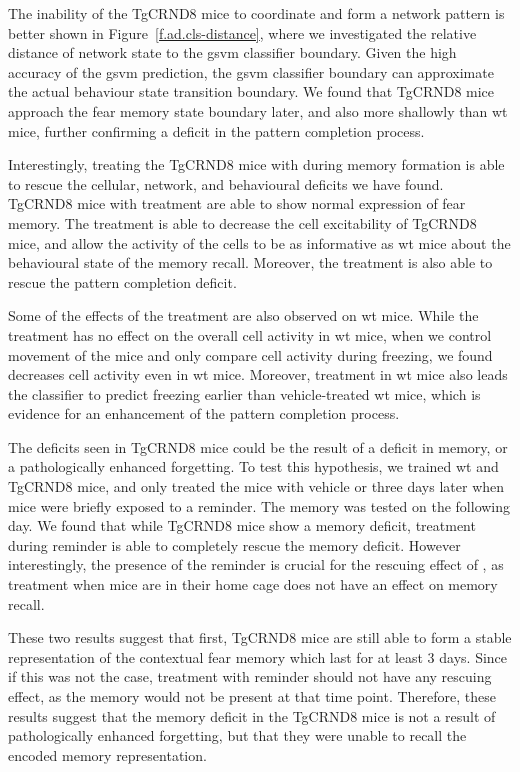 The inability of the TgCRND8 mice to coordinate and form a network pattern is better shown in Figure~\ref{f.ad.cls-distance}, where we investigated the relative distance of network state to the \gls{gsvm} classifier boundary. Given the high accuracy of the \gls{gsvm} prediction, the \gls{gsvm} classifier boundary can approximate the actual behaviour state transition boundary. We found that TgCRND8 mice approach the fear memory state boundary later, and also more shallowly than \gls{wt} mice, further confirming a deficit in the pattern completion process. 

Interestingly, treating the TgCRND8 mice with \tglu{} during memory formation is able to rescue the cellular, network, and behavioural deficits we have found. TgCRND8 mice with \tglu{} treatment are able to show normal expression of fear memory. The \tglu{} treatment is able to decrease the cell excitability of TgCRND8 mice, and allow the activity of the cells to be as informative as \gls{wt} mice about the behavioural state of the memory recall. Moreover, the \tglu{} treatment is also able to rescue the pattern completion deficit. 

Some of the effects of the \tglu{} treatment are also observed on \gls{wt} mice. While the \tglu{} treatment has no effect on the overall cell activity in \gls{wt} mice, when we control movement of the mice and only compare cell activity during freezing, we found \tglu{} decreases cell activity even in \gls{wt} mice. Moreover, \tglu{} treatment in \gls{wt} mice also leads the classifier to predict freezing earlier than vehicle-treated \gls{wt} mice, which is evidence for an enhancement of the pattern completion process. 

The deficits seen in TgCRND8 mice could be the result of a deficit in memory, or a pathologically enhanced forgetting. To test this hypothesis, we trained \gls{wt} and TgCRND8 mice, and only treated the mice with vehicle or \tglu{} three days later when mice were briefly exposed to a reminder. The memory was tested on the following day. We found that while TgCRND8 mice show a memory deficit, \tglu{} treatment during reminder is able to completely rescue the memory deficit. However interestingly, the presence of the reminder is crucial for the rescuing effect of \tglu, as \tglu{} treatment when mice are in their home cage does not have an effect on memory recall. 

These two results suggest that first, TgCRND8 mice are still able to form a stable representation of the contextual fear memory which last for at least 3 days. Since if this was not the case, \tglu{} treatment with reminder should not have any rescuing effect, as the memory would not be present at that time point. Therefore, these results suggest that the memory deficit in the TgCRND8 mice is not a result of pathologically enhanced forgetting, but that they were unable to recall the encoded memory representation.


